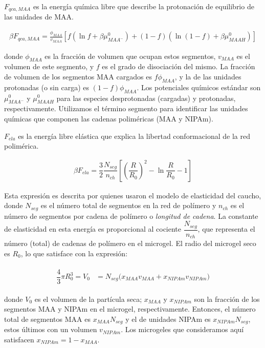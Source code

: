 $F_{qca,MAA}$ es la energ\'ia qu\'imica libre que describe la protonaci\'on de equilibrio de las unidades de MAA.


\begin{align}
	\beta F_{qca, MAA} =  \frac{\phi_{MAA}}{v_{MAA}} \left[f(\ln f+ \beta\mu^0_{MAA^-}) +(1-f)(\ln (1-f)+\beta\mu^0_{MAAH})\right]
\end{align}


\noindent donde $\phi_{MAA}$ es la fracci\'on de volumen que ocupan estos segmentos, $v_{MAA}$ es el volumen de este segmento, y $f$ es el grado de disociaci\'on del mismo. 
La fracci\'on de volumen de los segmentos MAA cargados es $f\phi_{MAA}$, y la de las unidades protonadas (o sin carga) es $(1-f)\phi_{MAA}$.
Los potenciales qu\'imicos est\'andar son $\mu^0_{MAA^-}$ y $\mu^0_{MAAH}$ para las especies desprotonadas (cargadas) y protonadas, respectivamente.
Utilizamos el t\'ermino segmento para identificar las unidades qu\'imicas que componen las cadenas polim\'ericas (MAA y NIPAm).


$F_{ela}$ es la energ\'ia libre el\'astica que explica la libertad conformacional de la red polim\'erica.

\begin{align}
	\beta F_{ela} = \dfrac{3}{2}\dfrac{N_{seg}}{n_{ch} }\left[\left(\dfrac{R}{R_0}\right)^2 - \ln\dfrac{R}{R_0} -1\right]
\end{align}

Esta expresi\'on es descrita por  \citet{moncho-jorda2016a} quienes usaron el modelo de elasticidad del caucho,
donde $N_{seg}$ es el n\'umero total de segmentos en la red de pol\'imero y $n_{ch}$ es el n\'umero de segmentos por cadena de pol\'imero o \emph{longitud de cadena}.
La constante de elasticidad en esta energ\'ia es proporcional al cociente $\dfrac{N_{seg}}{n_{ch}}$, que representa el n\'umero (total) de cadenas de pol\'imero en el microgel.
El radio del microgel seco es $R_0$, lo que satisface con la expresi\'on:

%
%
\begin{align}
	\begin{aligned} 
		\dfrac{4}{3}\pi R_0^3=V_0&=N_{seg}\Big( x_{MAA} v_{MAA} +x_{NIPAm} v_{NIPAm}\Big)
	\end{aligned}
\end{align}


\noindent donde $V_0$ es el volumen de la part\'icula seca; $x_{MAA}$ y $x_{NIPAm}$ son la fracci\'on de los segmentos MAA y NIPAm en el microgel, respectivamente.
Entonces, el n\'umero total de segmentos MAA es $x_{MAA}N_{seg}$ y el de unidades NIPAm es $x_{NIPAm}N_{seg}$, estos \'ultimos con un volumen $v_{NIPAm}$.
Los microgeles que consideramos aqu\'i satisfacen $x_{NIPAm}=1-x_{MAA}$.



